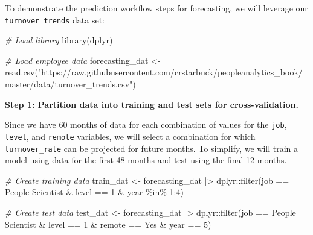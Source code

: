 \documentclass[
]{book}
\newenvironment{Shaded}{\begin{snugshade}}{\end{snugshade}}
\newcommand{\CommentTok}[1]{\textcolor[rgb]{0.56,0.35,0.01}{\textit{#1}}}
\newcommand{\DecValTok}[1]{\textcolor[rgb]{0.00,0.00,0.81}{#1}}
\newcommand{\FunctionTok}[1]{\textcolor[rgb]{0.00,0.00,0.00}{#1}}
\newcommand{\NormalTok}[1]{#1}
\newcommand{\OtherTok}[1]{\textcolor[rgb]{0.56,0.35,0.01}{#1}}
\newcommand{\SpecialCharTok}[1]{\textcolor[rgb]{0.00,0.00,0.00}{#1}}
\newcommand{\StringTok}[1]{\textcolor[rgb]{0.31,0.60,0.02}{#1}}
\begin{document}
To demonstrate the prediction workflow steps for forecasting, we will leverage our \texttt{turnover\_trends} data set:

\begin{Shaded}
\begin{Highlighting}[]
\CommentTok{\# Load library}
\FunctionTok{library}\NormalTok{(dplyr)}

\CommentTok{\# Load employee data}
\NormalTok{forecasting\_dat }\OtherTok{\textless{}{-}} \FunctionTok{read.csv}\NormalTok{(}\StringTok{"https://raw.githubusercontent.com/crstarbuck/peopleanalytics\_book/master/data/turnover\_trends.csv"}\NormalTok{)}
\end{Highlighting}
\end{Shaded}

\textbf{Step 1: Partition data into training and test sets for cross-validation.}

Since we have 60 months of data for each combination of values for the \texttt{job}, \texttt{level}, and \texttt{remote} variables, we will select a combination for which \texttt{turnover\_rate} can be projected for future months. To simplify, we will train a model using data for the first 48 months and test using the final 12 months.

\begin{Shaded}
\begin{Highlighting}[]
\CommentTok{\# Create training data}
\NormalTok{train\_dat }\OtherTok{\textless{}{-}}\NormalTok{ forecasting\_dat }\SpecialCharTok{|\textgreater{}}\NormalTok{ dplyr}\SpecialCharTok{::}\FunctionTok{filter}\NormalTok{(job }\SpecialCharTok{==} \StringTok{\textquotesingle{}People Scientist\textquotesingle{}} \SpecialCharTok{\&}\NormalTok{ level }\SpecialCharTok{==} \DecValTok{1} \SpecialCharTok{\&}\NormalTok{ year }\SpecialCharTok{\%in\%} \DecValTok{1}\SpecialCharTok{:}\DecValTok{4}\NormalTok{)}

\CommentTok{\# Create test data}
\NormalTok{test\_dat }\OtherTok{\textless{}{-}}\NormalTok{ forecasting\_dat }\SpecialCharTok{|\textgreater{}}\NormalTok{ dplyr}\SpecialCharTok{::}\FunctionTok{filter}\NormalTok{(job }\SpecialCharTok{==} \StringTok{\textquotesingle{}People Scientist\textquotesingle{}} \SpecialCharTok{\&}\NormalTok{ level }\SpecialCharTok{==} \DecValTok{1} \SpecialCharTok{\&}\NormalTok{ remote }\SpecialCharTok{==} \StringTok{\textquotesingle{}Yes\textquotesingle{}} \SpecialCharTok{\&}\NormalTok{ year }\SpecialCharTok{==} \DecValTok{5}\NormalTok{)}
\end{Highlighting}
\end{Shaded}
\end{document}
